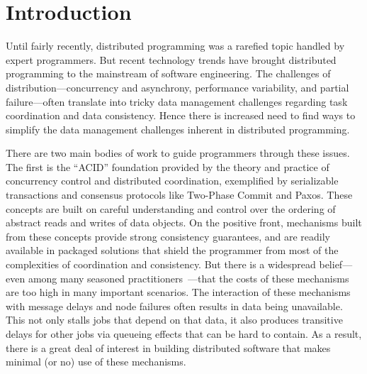 \section{Introduction}
Until fairly recently, distributed programming was a rarefied topic handled by expert programmers. But recent technology trends have brought distributed programming to the mainstream of software engineering.  The challenges of distribution---concurrency and asynchrony, performance variability, and partial failure---often translate into tricky data management challenges regarding task coordination and data consistency.
Hence there is increased need to find ways to simplify the data management challenges inherent in distributed programming.

There are two main bodies of work to guide programmers through these issues.  The first is the ``ACID'' foundation provided by the theory and practice of concurrency control and distributed coordination, exemplified by serializable transactions and consensus protocols like Two-Phase Commit and Paxos.  These concepts are built on careful understanding and control over the ordering of abstract reads and writes of data objects.  On the positive front, mechanisms built from these concepts provide strong consistency guarantees, and are readily available in packaged solutions that shield the programmer from most of the complexities of coordination and consistency.  But there is a widespread belief---even among many seasoned practitioners~\cite{ladis}---that the costs of these mechanisms are too high in many important scenarios.  The interaction of these mechanisms with message delays and node failures often results in data being unavailable. This not only stalls jobs that depend on that data, it also produces transitive delays for other jobs via queueing effects that can be hard to contain.  As a result, there is a great deal of interest in building distributed software that makes minimal (or no) use of these mechanisms.

